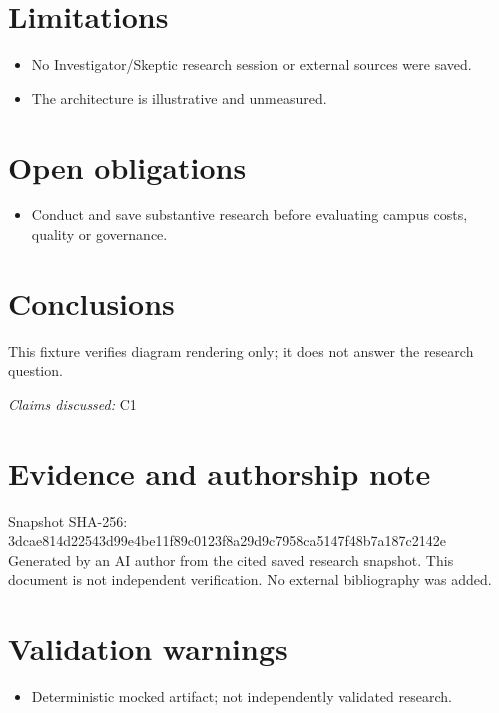 \documentclass[11pt]{article}
\begin{document}
\section{Limitations}
\begin{itemize}
\item No Investigator/Skeptic research session or external sources were saved.
\item The architecture is illustrative and unmeasured.
\end{itemize}
\section{Open obligations}
\begin{itemize}
\item Conduct and save substantive research before evaluating campus costs, quality or governance.
\end{itemize}
\section{Conclusions}
This fixture verifies diagram rendering only; it does not answer the research question.

\textit{Claims discussed: }C1
\section*{Evidence and authorship note}
Snapshot SHA-256: 3dcae814d22543d99e4be11f89c0123f8a29d9c7958ca5147f48b7a187c2142e
Generated by an AI author from the cited saved research snapshot. This document is not independent verification. No external bibliography was added.
\section*{Validation warnings}
\begin{itemize}
\item Deterministic mocked artifact; not independently validated research.
\end{itemize}
\end{document}
